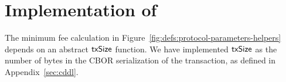 \section{Implementation of }
\label{sec:txSize}

The minimum fee calculation in Figure~\ref{fig:defs:protocol-parameters-helpers}
depends on an abstract $\mathsf{txSize}$ function.
We have implemented $\mathsf{txSize}$ as the number of bytes in the CBOR serialization
of the transaction, as defined in Appendix~\ref{sec:cddl}.
